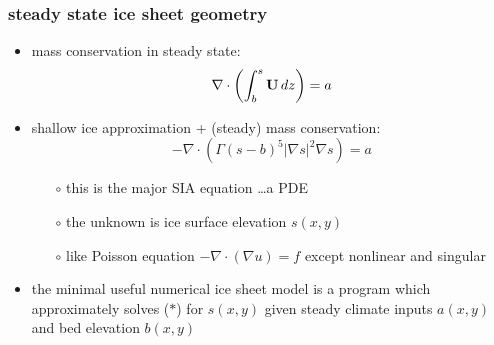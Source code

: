\documentclass[10pt,hyperref={pdfpagelabels=true}]{beamer}
\newcommand{\Div}{\nabla\cdot}
\begin{document}
\begin{frame}
  \frametitle{steady state ice sheet geometry}

\begin{itemize}
\item mass conservation in steady state: 
  $$\Div \left(  \int_b^s {\bf U}\, dz \right)  =  a$$
\item shallow ice approximation + (steady) mass conservation:
\begin{equation}
- \Div \left(\Gamma (s-b)^5 | \nabla s |^2 \nabla s  \right) =  a  \tag{$\ast$}
\end{equation}
  \begin{itemize}
  \vspace{-0.2in}
  \item[$\circ$] this is the major SIA equation \dots a PDE
  \item[$\circ$] the unknown is ice surface elevation $s(x,y)$
  \item[$\circ$] like Poisson equation $-\Div (\nabla u) = f$ except nonlinear and singular
  \end{itemize}
\item the \alert{minimal useful numerical ice sheet model} is a program which approximately solves ($\ast$) for $s(x,y)$ given steady climate inputs $a(x,y)$ and bed elevation $b(x,y)$
\end{itemize}
\end{frame}
\end{document}
